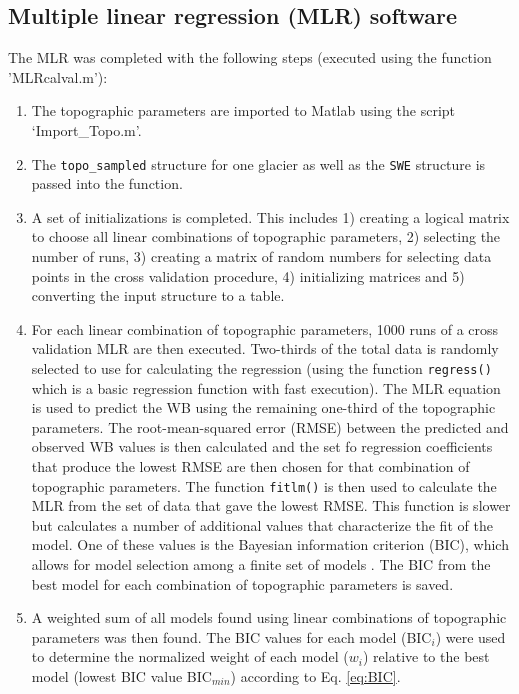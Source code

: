 \documentclass{sfuthesis}
\begin{document}
{\begin{appendices}
	\chapter{Multiple linear regression (MLR) software}
\label{sec:MLRMethods}

The MLR was completed with the following steps (executed using the function 'MLRcalval.m'):
\begin{enumerate}
\item The topographic parameters are imported to Matlab using the script `Import\_Topo.m'.

\item The \texttt{topo\_sampled} structure for one glacier as well as the \texttt{SWE} structure is passed into the function.

\item A set of initializations is completed. This includes 1) creating a logical matrix to choose all linear combinations of topographic parameters, 2) selecting the number of runs, 3) creating a matrix of random numbers for selecting data points in the cross validation procedure, 4) initializing matrices and 5) converting the input structure to a table.

\item For each linear combination of topographic parameters, 1000 runs of a cross validation MLR are then executed. Two-thirds of the total data is randomly selected \citep{Kohavi1995} to use for calculating the regression (using the function \texttt{regress()} which is a basic regression function with fast execution). The MLR equation is used to predict the WB using the remaining one-third of the topographic parameters. The root-mean-squared error (RMSE) between the predicted and observed WB values is then calculated and the set fo regression coefficients that produce the lowest RMSE are then chosen for that combination of topographic parameters. The function \texttt{fitlm()} is then used to calculate the MLR from the set of data that gave the lowest RMSE. This function is slower but calculates a number of additional values that characterize the fit of the model. One of these values is the Bayesian information criterion (BIC), which allows for model selection among a finite set of models \citep{Burnham2004}. The BIC from the best model for each combination of topographic parameters is saved.

\item A weighted sum of all models found using linear combinations of topographic parameters was then found. The BIC values for each model (BIC$_i$) were used to determine the normalized weight of each model ($w_i$) relative to the best model (lowest BIC value BIC$_{min}$) according to Eq. \ref{eq:BIC}.


\end{enumerate}
\end{appendices}}
\end{document}
